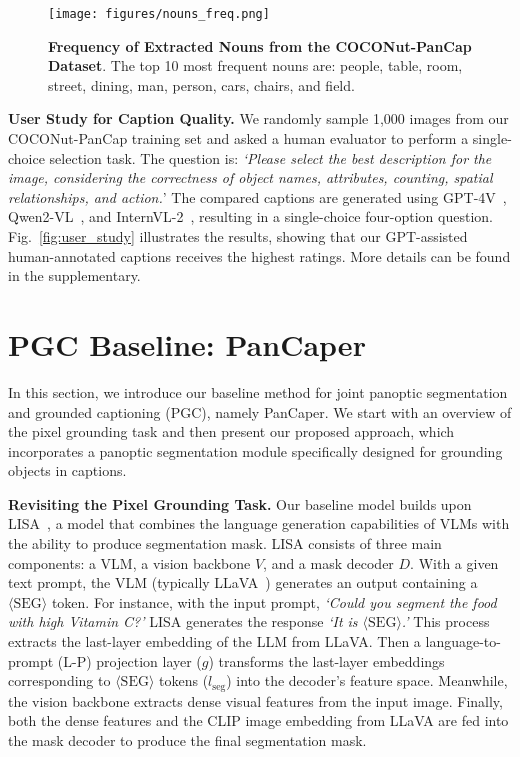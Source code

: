 \begin{figure}
    \centering
    \texttt{[image: figures/nouns\_freq.png]}
    \caption{\textbf{Frequency of Extracted Nouns from the COCONut-PanCap Dataset}. The top 10 most frequent nouns are: people, table, room, street, dining, man, person, cars, chairs, and field.}
    \label{fig:freq_nouns}
\end{figure}
\noindent\textbf{User Study for Caption Quality.}
We randomly sample 1,000 images from our COCONut-PanCap training set and asked a human evaluator to perform a single-choice selection task. The question is: \textit{`Please select the best description for the image, considering the correctness of object names, attributes, counting, spatial relationships, and action.}' The compared captions are generated using GPT-4V~\cite{achiam2023gpt4v}, Qwen2-VL~\cite{wang2024qwen2vl}, and InternVL-2~\cite{chen2024internvl2}, resulting in a single-choice four-option question. Fig.~\ref{fig:user_study} illustrates the results, showing that our GPT-assisted human-annotated captions receives the highest ratings. More details can be found in the supplementary.

\section{PGC Baseline: PanCaper }
In this section, we introduce our baseline method for joint panoptic segmentation and grounded captioning (PGC), namely PanCaper. We start with an overview of the pixel grounding task and then present our proposed approach, which incorporates a panoptic segmentation module specifically designed for grounding objects in captions.



\noindent\textbf{Revisiting the Pixel Grounding Task.} Our baseline model builds upon LISA~\cite{lai2024lisa}, a model that combines the language generation capabilities of VLMs with the ability to produce segmentation mask. LISA consists of three main components: a VLM, a vision backbone $V$, and a mask decoder $D$.
With a given text prompt, the VLM (typically LLaVA~\cite{liu2023llava,liu2023improvedllava}) generates an output containing a $\langle \mathrm{SEG} \rangle$ token. For instance, with the input prompt, \textit{`Could you segment the food with high Vitamin C?'} LISA generates the response \textit{`It is $\langle \mathrm{SEG} \rangle$.'} This process extracts the last-layer embedding of the LLM from LLaVA. Then a language-to-prompt (L-P) projection layer ($g$) transforms the last-layer embeddings corresponding to $\langle \mathrm{SEG} \rangle$ tokens ($l_{\mathrm{seg}}$) into the decoder's feature space. Meanwhile, the vision backbone extracts dense visual features from the input image. Finally, both the dense features and the CLIP image embedding from LLaVA are fed into the mask decoder to produce the final segmentation mask.


